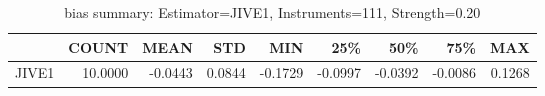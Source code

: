 \begin{table}[ht]
\centering
\caption{bias summary: Estimator=JIVE1, Instruments=111, Strength=0.20}
\begin{tabular}{lrrrrrrrr}
\toprule
 & COUNT & MEAN & STD & MIN & 25\% & 50\% & 75\% & MAX \\
\midrule
JIVE1 & 10.0000 & -0.0443 & 0.0844 & -0.1729 & -0.0997 & -0.0392 & -0.0086 & 0.1268 \\
\bottomrule
\end{tabular}
\end{table}
